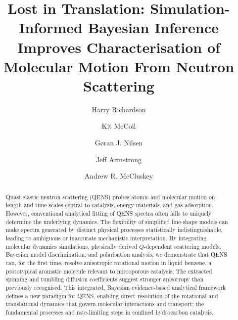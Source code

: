 \documentclass[reprint,
               superscriptaddress,
               nobibnotes,
               amsmath,
               amssymb,
               aps,
               hidelinks, 
               pre]{revtex4-2}
\title@column\titleblock@produce
\newcommand{\papertitle}{Lost in Translation: Simulation-Informed Bayesian Inference Improves Characterisation of Molecular Motion From Neutron Scattering}
\begin{document}
\let\oldaddcontentsline\addcontentsline
\renewcommand{\addcontentsline}[3]{}

\title{\papertitle}

\author{Harry Richardson}
\author{Kit McColl}
\author{Gøran J. Nilsen}
\author{Jeff Armstrong}
\author{Andrew R. McCluskey}

\begin{abstract}
Quasi-elastic neutron scattering (QENS) probes atomic and molecular motion on length and time scales central to catalysis, energy materials, and gas adsorption. 
However, conventional analytical fitting of QENS spectra often fails to uniquely determine the underlying dynamics.
The flexibility of simplified line-shape models can make spectra generated by distinct physical processes statistically indistinguishable, leading to ambiguous or inaccurate mechanistic interpretation.
By integrating molecular dynamics simulations, physically derived $Q$-dependent scattering models, Bayesian model discrimination, and polarisation analysis, we demonstrate that QENS can, for the first time, resolve anisotropic rotational motion in liquid benzene, a prototypical aromatic molecule relevant to microporous catalysis. 
The extracted spinning and tumbling diffusion coefficients suggest stronger anisotropy than previously recognised.
This integrated, Bayesian evidence-based analytical framework defines a new paradigm for QENS, enabling direct resolution of the rotational and translational dynamics that govern molecular interactions and transport; the fundamental processes and rate-limiting steps in confined hydrocarbon catalysis.
\end{abstract}
\end{document}
